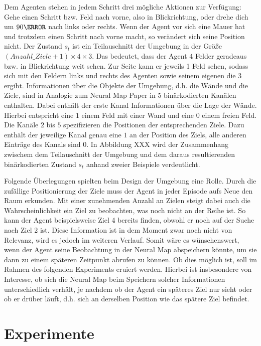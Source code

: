 Dem Agenten stehen in jedem Schritt drei mögliche Aktionen zur Verfügung: Gehe einen Schritt bzw. Feld nach vorne, also in Blickrichtung, oder drehe dich um $90\degree$ nach links oder rechts. Wenn der Agent vor sich eine Mauer hat und trotzdem einen Schritt nach vorne macht, so verändert sich seine Position nicht. Der Zustand $s_t$ ist ein Teilauschnitt der Umgebung in der Größe $(Anzahl\_Ziele + 1) \times 4 \times 3$. Das bedeutet, dass der Agent $4$ Felder geradeaus bzw. in Blickrichtung weit sehen. Zur Seite kann er jeweils 1 Feld sehen, sodass sich mit den Feldern links und rechts des Agenten sowie seinem eigenen die $3$ ergibt. Informationen über die Objekte der Umgebung, d.h. die Wände und die Ziele, sind in Analogie zum Neural Map Paper in 5 binärkodierten Kanälen enthalten. Dabei enthält der erste Kanal Informationen über die Lage der Wände. Hierbei entspricht eine $1$ einem Feld mit einer Wand und eine $0$ einem freien Feld. Die Kanäle $2$ bis $5$ spezifizieren die Positionen der entsprechenden Ziele. Dazu enthält der jeweilige Kanal genau eine $1$ an der Position des Ziels, alle anderen Einträge des Kanals sind $0$. In Abbildung XXX wird der Zusammenhang zwischem dem Teilauschnitt der Umgebung und dem daraus resultierenden binärkodierten Zustand $s_t$ anhand zweier Beispiele verdeutlicht.

Folgende Überlegungen spielten beim Design der Umgebung eine Rolle. Durch die zufällige Positionierung der Ziele muss der Agent in jeder Episode aufs Neue den Raum erkunden. Mit einer zunehmenden Anzahl an Zielen steigt dabei auch die Wahrscheinlichkeit ein Ziel zu beobachten, was noch nicht an der Reihe ist. So kann der Agent beispielsweise Ziel 4 bereits finden, obwohl er noch auf der Suche nach Ziel 2 ist. Diese Information ist in dem Moment zwar noch nicht von Relevanz, wird es jedoch im weiteren Verlauf. Somit wäre es wünschenswert, wenn der Agent seine Beobachtung in der Neural Map abspeichern könnte, um sie dann zu einem späteren Zeitpunkt abrufen zu können. Ob dies möglich ist, soll im Rahmen des folgenden Experiments eruiert werden. Hierbei ist insbesondere von Interesse, ob sich die Neural Map beim Speichern solcher Informationen unterschiedlich verhält, je nachdem ob der Agent ein späteres Ziel \glqq nur \grqq{} sieht oder ob er drüber läuft, d.h. sich an derselben Position wie das spätere Ziel befindet.


\section{Experimente}
